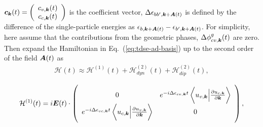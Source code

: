 $\boldsymbol c_{\boldsymbol k}(t) = \left(
    \begin{array}{cc}
      c_{v,\boldsymbol k}(t) \\
      c_{c,\boldsymbol k}(t)
    \end{array}
    \right)$ is the coefficient vector,  $\Delta\epsilon_{bb',\boldsymbol k+ \boldsymbol A(t)}$ is defined by the difference of the single-particle energies as $\epsilon_{b,\boldsymbol k+ \boldsymbol A(t)}-\epsilon_{b',\boldsymbol k+ \boldsymbol A(t)}$. For simplicity, here assume that the contributions from the geometric phases, $\Delta \phi^g_{cv,\boldsymbol k}(t)$ are zero. Then expand the Hamiltonian in Eq.~(\ref{eq:tdse-ad-basis}) up to the second order of the field $\boldsymbol A(t)$ as
\begin{align}
\mathcal{H}(t)\approx \mathcal{H}^{(1)}(t) + \mathcal{H}^{(2)}_{dyn}(t) + \mathcal{H}^{(2)}_{dip}(t),
\end{align}

\begin{align}
\mathcal{H}^{(1)}(t) = i \boldsymbol E(t)\cdot 
\left(
    \begin{array}{cc}
      0 & 
      e^{-i \Delta \epsilon_{cv,\boldsymbol k}t} 
  \left \langle u_{v,\boldsymbol k}\Big |\frac{\partial u_{c,\boldsymbol k}}{\partial \boldsymbol k} \right \rangle \\
      e^{-i\Delta \epsilon_{vc,\boldsymbol k}t}
  \left \langle u_{c,\boldsymbol k}\Big |\frac{\partial u_{v,\boldsymbol k}}{\partial \boldsymbol k} \right \rangle &
      0
    \end{array}
    \right),
\end{align}

